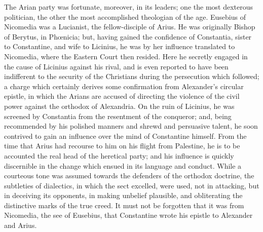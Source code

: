 The Arian party was fortunate, moreover, in its leaders; one the
most dexterous politician, the other the most accomplished theologian
of the age. Eusebius of Nicomedia was a Lucianist, the fellow-disciple
of Arius. He was originally Bishop of Berytus, in Phœnicia; but,
having gained the confidence of Constantia, sister to Constantine, and
wife to Licinius, he was by her influence translated to
Nicomedia, where the Eastern Court then resided. Here he secretly
engaged in the cause of Licinius against his rival, and is even
reported to have been indifferent to the security of the Christians
during the persecution which followed; a charge which certainly
derives some confirmation from Alexander's circular epistle, in which
the Arians are accused of directing the violence of the civil power
against the orthodox of Alexandria. On the ruin of Licinius, he was
screened by Constantia from the resentment of the conqueror; and,
being recommended by his polished manners and shrewd and persuasive
talent, he soon contrived to gain an influence over the mind of
Constantine himself. From the time that Arius had recourse to him on
his flight from Palestine, he is to be accounted the real head of the
heretical party; and his influence is quickly discernible in the
change which ensued in its language and conduct. While a courteous
tone was assumed towards the defenders of the orthodox doctrine, the
subtleties of dialectics, in which the sect excelled, were used, not
in attacking, but in deceiving its opponents, in making unbelief
plausible, and obliterating the distinctive marks of the true creed.
It must not be forgotten that it was from Nicomedia, the see of
Eusebius, that Constantine wrote his epistle to Alexander and Arius.

